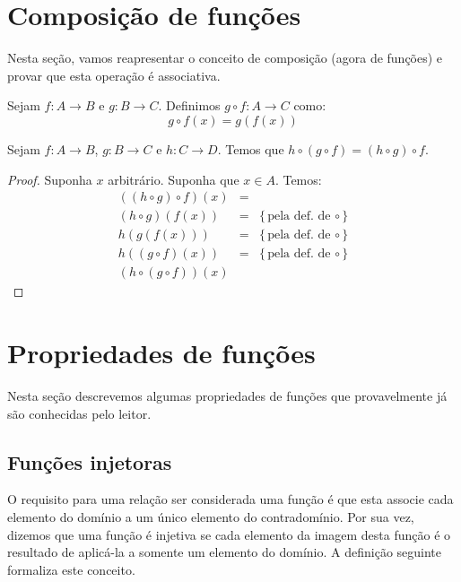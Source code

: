 \section{Composição de funções}

Nesta seção, vamos reapresentar o conceito de composição (agora de
funções) e provar que esta operação é associativa.

\begin{Definition}
Sejam $f : A \to B$ e $g : B \to C$. Definimos $g \circ f : A \to C$
como:
\[
g \circ f (x) = g (f(x))
\]
\end{Definition}

\begin{Theorem}
Sejam $f : A \to B$, $g : B \to C$ e $h : C \to D$. Temos que $h \circ
(g \circ f) = (h \circ g) \circ f$.
\end{Theorem}
\begin{proof}
Suponha $x$ arbitrário. Suponha que $x \in A$. Temos:
\[
\begin{array}{lcl}
((h \circ g) \circ f)(x) & = \\
(h \circ g) (f(x)) & = & \{\text{pela def. de $\circ$}\}\\
h (g (f (x))) & = & \{\text{pela def. de $\circ$}\}\\
h ((g \circ f) (x)) & = & \{\text{pela def. de $\circ$}\}\\
(h \circ (g \circ f)) (x)
\end{array}
\]
\end{proof}

\section{Propriedades de funções}

Nesta seção descrevemos algumas propriedades de funções que
provavelmente já são conhecidas pelo leitor.

\subsection{Funções injetoras}

O requisito para uma relação ser considerada uma função é que esta
associe cada elemento do domínio a um único elemento do
contradomínio. Por sua vez, dizemos que uma função é injetiva se cada
elemento da imagem desta função é o resultado de aplicá-la a somente
um elemento do domínio. A definição seguinte formaliza este conceito.

